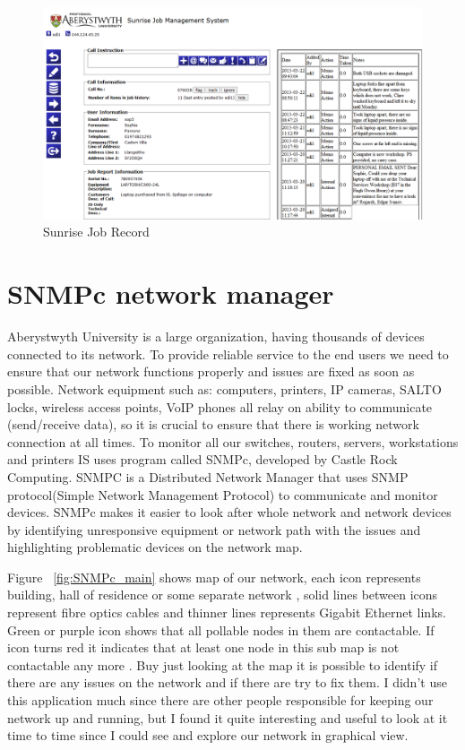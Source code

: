 \documentclass[10pt,a4paper,headinclude=true]{report}
\begin{document}
\begin{figure}[H]
\centering
\centerline{\includegraphics[scale=0.5]{./sunrise_job}}
\caption{Sunrise Job Record}
\label{fig:sunrise_job}
\end{figure}

\section{SNMPc network manager}
Aberystwyth University is a large organization, having thousands of devices connected to its network. To provide reliable service to the end users we need to ensure that our network functions properly and issues are fixed as soon as possible. Network equipment such as: computers, printers, IP cameras, SALTO locks, wireless access points, VoIP phones all relay on ability to communicate (send/receive data), so it is crucial to ensure that there is working network connection at all times.  To monitor all our switches, routers, servers, workstations and printers IS uses program called SNMPc, developed by Castle Rock Computing. SNMPC is a Distributed Network Manager \cite{SNMPc} that uses SNMP protocol(Simple Network Management Protocol) to communicate and monitor devices. SNMPc makes it easier to look after whole network and network devices by identifying unresponsive equipment or network path with the issues and highlighting problematic devices on the network map. 

Figure ~\ref{fig:SNMPc_main} shows map of our network, each icon represents building, hall of residence or some separate network , solid lines between icons represent fibre optics cables and thinner lines represents Gigabit Ethernet links. Green or purple icon shows that all pollable nodes in them are contactable. If icon turns red it indicates that at least one node in this sub map is not contactable any more \cite{SNPMcSharePoint}. Buy just looking at the map it is possible to identify if there are any issues on the network and if there are try to fix them. I didn't use this application much since there are other people responsible for keeping our network up and running, but I found it quite interesting and useful to look at it time to time since I could see and explore our network in graphical view.
\end{document}
